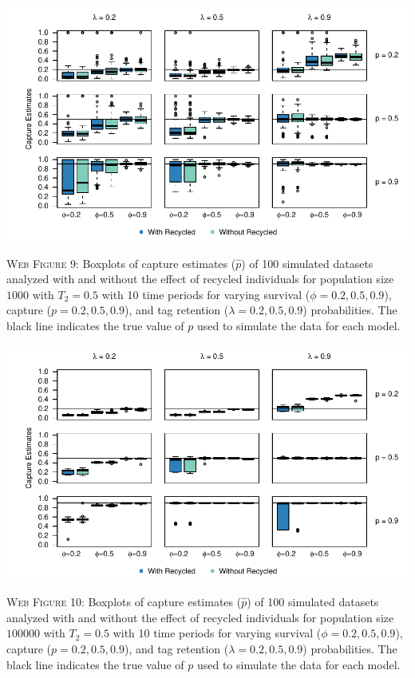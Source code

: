 \documentclass[]{article}
\begin{document}
\newpage

\includegraphics{Appendix_files/figure-latex/9_capture_GJSTL4-1.pdf}

\textsc{Web Figure 9:} Boxplots of capture estimates (\(\hat{p}\)) of
100 simulated datasets analyzed with and without the effect of recycled
individuals for population size \(1000\) with \(T_2=0.5\) with 10 time
periods for varying survival (\(\phi=0.2,0.5,0.9\)), capture
(\(p=0.2,0.5,0.9\)), and tag retention (\(\lambda=0.2,0.5,0.9\))
probabilities. The black line indicates the true value of \(p\) used to
simulate the data for each model.

\includegraphics{Appendix_files/figure-latex/10_capture_GJSTL3-1.pdf}

\textsc{Web Figure 10:} Boxplots of capture estimates (\(\hat{p}\)) of
100 simulated datasets analyzed with and without the effect of recycled
individuals for population size \(100000\) with \(T_2=0.5\) with 10 time
periods for varying survival (\(\phi=0.2,0.5,0.9\)), capture
(\(p=0.2,0.5,0.9\)), and tag retention (\(\lambda=0.2,0.5,0.9\))
probabilities. The black line indicates the true value of \(p\) used to
simulate the data for each model.
\end{document}
